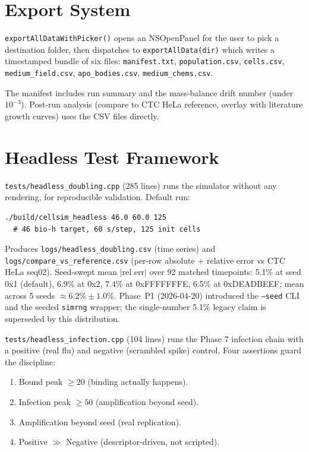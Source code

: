 \documentclass[11pt,letterpaper,twoside,openany]{book}
\newcommand{\code}[1]{\texttt{#1}}
\newcommand{\file}[1]{\texttt{\small#1}}
\begin{document}
\chapter{Export System}
\label{ch:export}

\code{exportAllDataWithPicker()} opens an NSOpenPanel for the user
to pick a destination folder, then dispatches to
\code{exportAllData(dir)} which writes a timestamped bundle of six
files: \file{manifest.txt}, \file{population.csv},
\file{cells.csv}, \file{medium\_field.csv}, \file{apo\_bodies.csv},
\file{medium\_chems.csv}.

The manifest includes run summary and the mass-balance drift
number (under $10^{-3}$). Post-run analysis (compare to CTC HeLa
reference, overlay with literature growth curves) uses the CSV
files directly.

\chapter{Headless Test Framework}
\label{ch:headless}

\file{tests/headless\_doubling.cpp} (285 lines) runs the simulator
without any rendering, for reproducible validation. Default run:

\begin{verbatim}
./build/cellsim_headless 46.0 60.0 125
  # 46 bio-h target, 60 s/step, 125 init cells
\end{verbatim}

Produces \file{logs/headless\_doubling.csv} (time series) and
\file{logs/compare\_vs\_reference.csv} (per-row absolute + relative
error vs CTC HeLa seq02). Seed-swept mean
$|\text{rel err}|$ over 92 matched timepoints: 5.1\% at seed 0x1
(default), 6.9\% at 0x2, 7.4\% at 0xFFFFFFFE, 6.5\% at 0xDEADBEEF;
mean across 5 seeds $\approx 6.2\% \pm 1.0\%$. Phase~P1
(2026-04-20) introduced the \code{--seed} CLI and the seeded
\code{simrng} wrapper; the single-number 5.1\% legacy claim is
superseded by this distribution.

\file{tests/headless\_infection.cpp} (104 lines) runs the Phase 7
infection chain with a positive (real flu) and negative (scrambled
spike) control. Four assertions guard the discipline:
\begin{enumerate}
  \item Bound peak $\ge 20$ (binding actually happens).
  \item Infection peak $\ge 50$ (amplification beyond seed).
  \item Amplification beyond seed (real replication).
  \item Positive $\gg$ Negative (descriptor-driven, not scripted).
\end{enumerate}
\end{document}
